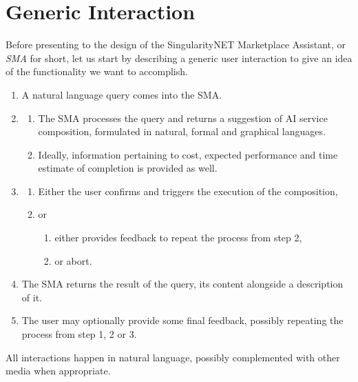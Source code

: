 \documentclass[]{article}
\begin{document}
\section{Generic Interaction}
Before presenting to the design of the SingularityNET Marketplace
Assistant, or \emph{SMA} for short, let us start by describing a
generic user interaction to give an idea of the functionality we want
to accomplish.
\begin{enumerate}
\item A natural language query comes into the SMA.
\item
  \begin{enumerate}
  \item The SMA processes the query and returns a suggestion of AI
    service composition, formulated in natural, formal and graphical
    languages.
  \item Ideally, information pertaining to cost, expected performance
    and time estimate of completion is provided as well.
  \end{enumerate}
\item
  \begin{enumerate}
  \item Either the user confirms and triggers the execution of the
    composition,
  \item or
    \begin{enumerate}
    \item either provides feedback to repeat the process from step 2,
    \item or abort.
    \end{enumerate}
  \end{enumerate}
\item The SMA returns the result of the query, its content alongside a
  description of it.
\item The user may optionally provide some final feedback, possibly
  repeating the process from step 1, 2 or 3.
\end{enumerate}
All interactions happen in natural language, possibly complemented
with other media when appropriate.
\end{document}
